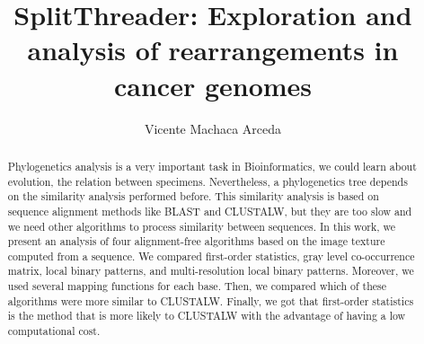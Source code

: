 \documentclass{svproc}
\begin{document}
\mainmatter              %
%
\title{SplitThreader: Exploration and analysis of rearrangements in cancer genomes}
%

\author{Vicente Machaca Arceda }


\maketitle             

\begin{abstract}

Phylogenetics analysis is a very important task in Bioinformatics, we could learn about evolution, the relation between specimens. Nevertheless, a phylogenetics tree depends on the similarity analysis performed before. This similarity analysis is based on sequence alignment methods like  BLAST and CLUSTALW, but they are too slow and we need other algorithms to process similarity between sequences. In this work, we present an analysis of four alignment-free algorithms based on the image texture computed from a sequence. We compared first-order statistics, gray level co-occurrence matrix, local binary patterns, and multi-resolution local binary patterns. Moreover, we used several mapping functions for each base. Then, we compared which of these algorithms were more similar to CLUSTALW. Finally, we got that first-order statistics is the method that is more likely to CLUSTALW with the advantage of having a low computational cost.

\end{abstract}



\end{document}
